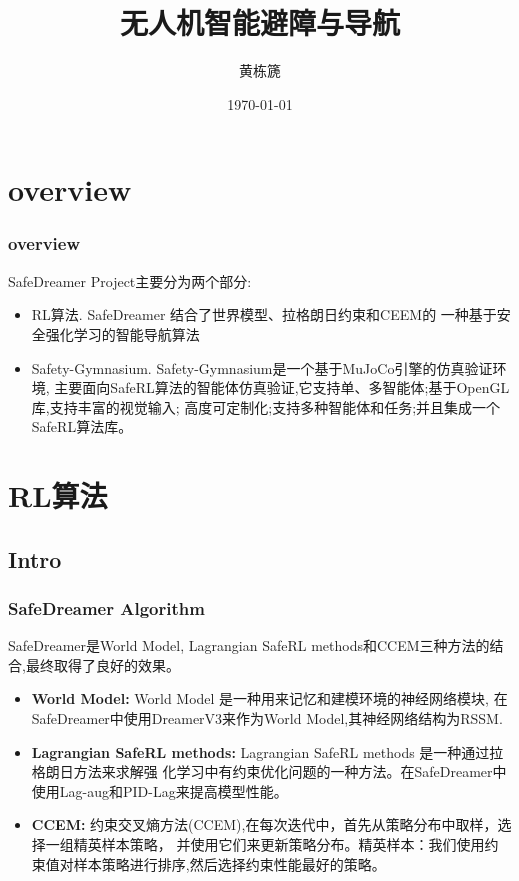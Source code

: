 \documentclass[10pt,mathserif]{beamer}%
\title{无人机智能避障与导航}
\institute[北京航空航天大学\\计算机学院]{北京航空航天大学计算机学院23级硕士研究
生} %
\author{黄栋篪}
\date{\today}%
\begin{document}
{\xdbg {}}%

\section{overview}

\begin{frame}[t, fragile]
	\frametitle{overview}
	\begin{spacing}{1.5}
		SafeDreamer Project主要分为两个部分:
		\begin{itemize}
			\item RL算法. SafeDreamer 结合了世界模型、拉格朗日约束和CEEM的
			一种基于安全强化学习的智能导航算法
			\item Safety-Gymnasium. Safety-Gymnasium是一个基于MuJoCo引擎的仿真验证环境,
			主要面向SafeRL算法的智能体仿真验证,它支持单、多智能体;基于OpenGL库,支持丰富的视觉输入;
			高度可定制化;支持多种智能体和任务;并且集成一个SafeRL算法库。
		\end{itemize}
	\end{spacing}
\end{frame}

\section{RL算法}

\subsection{Intro}

\begin{frame}[t, fragile]
	\frametitle{SafeDreamer Algorithm}
	\begin{spacing}{1.3}
		SafeDreamer是World Model, Lagrangian SafeRL methods和CCEM三种方法的结合,最终取得了良好的效果。
		\begin{itemize}
			\item \textbf{World Model:} World Model 是一种用来记忆和建模环境的神经网络模块,
			在SafeDreamer中使用DreamerV3来作为World Model,其神经网络结构为RSSM.
			\item \textbf{Lagrangian SafeRL methods:} Lagrangian SafeRL methods 是一种通过拉格朗日方法来求解强
			化学习中有约束优化问题的一种方法。在SafeDreamer中使用Lag-aug和PID-Lag来提高模型性能。
			\item \textbf{CCEM:} 约束交叉熵方法(CCEM),在每次迭代中，首先从策略分布中取样，选择一组精英样本策略，
			并使用它们来更新策略分布。精英样本：我们使用约束值对样本策略进行排序,然后选择约束性能最好的策略。
		\end{itemize}
	\end{spacing}
\end{frame}
\end{document}
